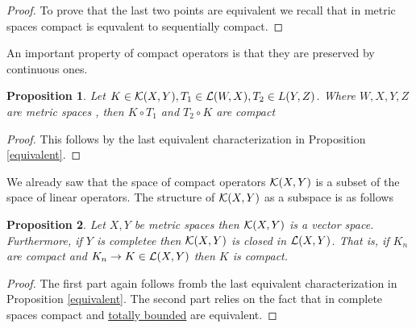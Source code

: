 \documentclass[12pt]{article}
\newtheorem{proposition}{Proposition}
\begin{document}
\begin{CJK*}{UTF8}{gbsn}
\begin{proof}
     To prove that the last two points are equivalent we recall that in metric spaces compact is equvalent to sequentially compact.
 \end{proof}
  An important property of compact operators is that they are preserved by continuous ones.
	\begin{proposition}\label{comp}Let $K \in \mathcal{K}(X,Y), T_1\in \mathcal{L}(W,X), T_2 \in L(Y,Z)$. Where $W,X,Y,Z$ are metric spaces , then $K\circ T_1$ and $T_2 \circ K$ are compact
	\end{proposition}
	\begin{proof}
    This follows by the last equivalent characterization in Proposition \ref{equivalent}.
	\end{proof}
  We already saw that the space of compact operators $\mathcal{K}(X,Y)$ is a subset of the space of linear operators. The structure of $\mathcal{K}(X,Y)$ as a subspace is as follows 
  \begin{proposition}
  Let $X,Y$ be metric spaces then  $\mathcal{K}(X,Y)$ is a vector space. Furthermore, if $Y$ is completee then  $\mathcal{K}(X,Y)$ is closed in $\mathcal{L}(X,Y)$. That is, if $K_n$ are compact and  $K_n \to K \in \mathcal{L}(X,Y)$ then $K$ is compact.
  \end{proposition}
  \begin{proof}
    The first part again follows fromb the last equivalent characterization in Proposition \ref{equivalent}. The second part relies on the fact that in complete spaces compact and \href{https://en.wikipedia.org/wiki/Totally_bounded_space#:~:text=not%20in%20general.-,In,-metric%20spaces%5B}{totally bounded} are equivalent.
  \end{proof}
      

\end{CJK*}
\end{document}
